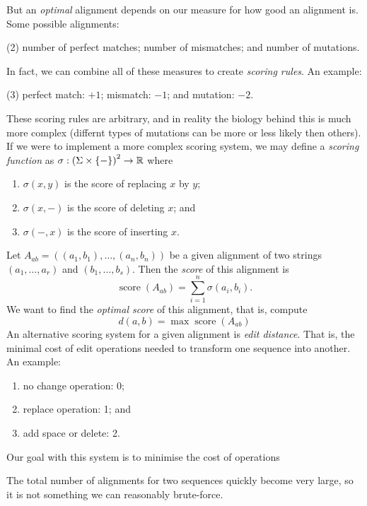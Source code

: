 But an \emph{optimal} alignment depends on our measure for how good an alignment
is. 
Some possible alignments:
\begin{tasks}(2)
	\task number of perfect matches;
	\task number of mismatches; and
	\task number of mutations.
\end{tasks}
In fact, we can combine all of these measures to create \emph{scoring rules}.
An example:
\begin{tasks}(3)
	\task perfect match: $+1$;
	\task mismatch: $-1$; and
	\task mutation: $-2$.
\end{tasks}
These scoring rules are arbitrary, and in reality the biology behind this
is much more complex (differnt types of mutations can be more or less likely
then others).
If we were to implement a more complex scoring system, we may define a
\emph{scoring function} as
$\sigma: \left( \Sigma \times \left\{ - \right\} \right)^2 \to \mathbb{R}$
where
\begin{enumerate}
	\item $\sigma(x,y)$ is the score of replacing $x$ by $y$;
	\item $\sigma(x,-)$ is the score of deleting $x$; and
	\item $\sigma(-, x)$ is the score of inserting $x$.
\end{enumerate}
Let $A_{ab} = ((a_1,b_1), \ldots, (a_n,b_n))$ be a 
given alignment of two strings $(a_1, \ldots, a_r)$
and $(b_1, \ldots, b_s)$.
Then the \emph{score} of this alignment
is
\[
	\operatorname{score}(A_{ab})
	= \sum_{i=1}^n \sigma(a_i,b_i).
\]
We want to find the \emph{optimal score} of this
alignment, that is, compute
\[
	d(a,b) = \max \operatorname{score}(A_{ab})
\]
An alternative scoring system for a given alignment is \emph{edit distance}.
That is, the minimal cost of edit operations needed to transform one sequence
into another.
An example:
\begin{enumerate}
	\item no change operation: 0;
	\item replace operation: 1; and
	\item add space or delete: 2.
\end{enumerate}
Our goal with this system is to minimise the cost of operations

The total number of alignments for two sequences quickly become very large, so it
is not something we can reasonably brute-force.


